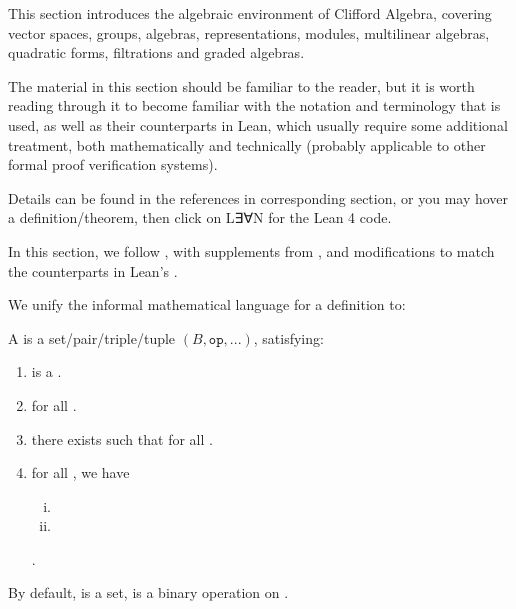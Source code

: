 This section introduces the algebraic environment of Clifford Algebra,
covering vector spaces, groups, algebras, representations, modules, multilinear algebras,
quadratic forms, filtrations and graded algebras.

The material in this section should be familiar to the reader, but it is worth reading
 through it to become familiar with the notation and terminology that is used,
 as well as their counterparts in Lean, which usually require some additional treatment, both
 mathematically and technically (probably applicable to other formal proof verification systems).

Details can be found in the references in corresponding section, or you may hover a definition/theorem,
then click on L∃∀N for the Lean 4 code.

In this section, we follow \cite{jadczyk2019notes}, with supplements from \cite{garling2011clifford, chen2016infinitely}, 
and modifications to match the counterparts in Lean's \Mathlib.

\begin{remark}
\label{mk:Informal}

We unify the informal mathematical language for a definition to:

A  is a set/pair/triple/tuple $(B, \mathtt{op}, ...)$, satisfying:

\begin{enumerate}
    \item {} is a  .

    \item {} for all  .
    
    \item {}
    there exists  such that
     for all .

    \item {}for all , we have

        \begin{enumerate}[(i)]

        \item {}
        \item {}
        
        \end{enumerate}

        .

\end{enumerate}

By default,  is a set,  is a binary operation on .

\end{remark}


